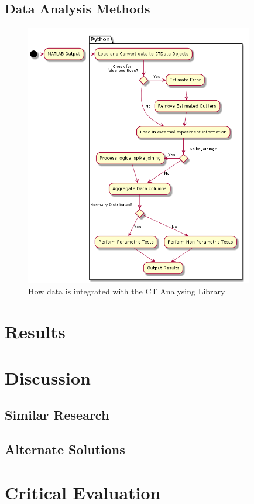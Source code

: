 \documentclass[11pt]{report}
\begin{document}
\section{Data Analysis Methods}
\label{sec-3-5}
\begin{center}
\begin{figure}[htb]
\centering
\includegraphics[width=10cm]{./images/pipeline.png}
\caption{\label{fig:pipeline}How data is integrated with the CT Analysing Library}
\end{figure}
\end{center}

\chapter{Results}
\label{sec-4}
\chapter{Discussion}
\label{sec-5}
\section{Similar Research}
\label{sec-5-1}
\section{Alternate Solutions}
\label{sec-5-2}

\chapter{Critical Evaluation}
\label{sec-6}
\end{document}
